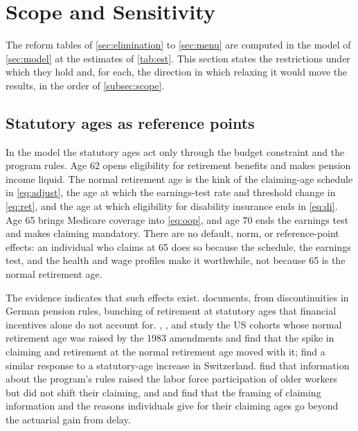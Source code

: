 \section{Scope and Sensitivity}\label{sec:scope}

The reform tables of \autoref{sec:elimination} to \autoref{sec:menu} are computed in the model of \autoref{sec:model} at the estimates of \autoref{tab:est}. This section states the restrictions under which they hold and, for each, the direction in which relaxing it would move the results, in the order of \autoref{subsec:scope}.

\subsection{Statutory ages as reference points}\label{subsec:reference}

In the model the statutory ages act only through the budget constraint and the program rules. Age 62 opens eligibility for retirement benefits and makes pension income liquid. The normal retirement age is the kink of the claiming-age schedule in \eqref{eq:adjust}, the age at which the earnings-test rate and threshold change in \eqref{eq:ret}, and the age at which eligibility for disability insurance ends in \eqref{eq:di}. Age 65 brings Medicare coverage into \eqref{eq:oop}, and age 70 ends the earnings test and makes claiming mandatory. %
There are no default, norm, or reference-point effects: an individual who claims at 65 does so because the schedule, the earnings test, and the health and wage profiles make it worthwhile, not because 65 is the normal retirement age. %

The evidence indicates that such effects exist. \citet{seibold2021reference} documents, from discontinuities in German pension rules, bunching of retirement at statutory ages that financial incentives alone do not account for. \citet{mastrobuoni2009labor}, \citet{behagel2012}, and \citet{deshpande2024sticky} study the US cohorts whose normal retirement age was raised by the 1983 amendments and find that the spike in claiming and retirement at the normal retirement age moved with it; \citet{lalive2023social} find a similar response to a statutory-age increase in Switzerland.
\citet{liebman2015would} find that information about the program's rules raised the labor force participation of older workers but did not shift their claiming, and \citet{brown2016framing} and \citet{shoven2017} find that the framing of claiming information and the reasons individuals give for their claiming ages go beyond the actuarial gain from delay.


